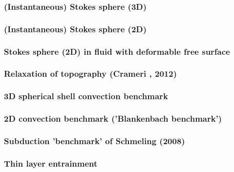 \newpage
\subsubsection{(Instantaneous) Stokes sphere (3D)} \label{ss:stokes_sphere3D}


\newpage
\subsubsection{(Instantaneous) Stokes sphere (2D)} \label{ss:stokes_sphere2D}


\newpage
\subsubsection{Stokes sphere (2D) in fluid with deformable free surface} \label{ss:stokes_sphere_fs2D}


\subsubsection{Relaxation of topography (Crameri \etal, 2012)} \label{ss:crsg12}


\subsubsection{3D spherical shell convection benchmark} \label{ss:sscb3D}


\subsubsection{2D convection benchmark ('Blankenbach \etal benchmark')} \label{ss:blbc89}


\subsubsection{Subduction 'benchmark' of Schmeling \etal (2008)}


\subsubsection{Thin layer entrainment} \label{sec:tlentr}

